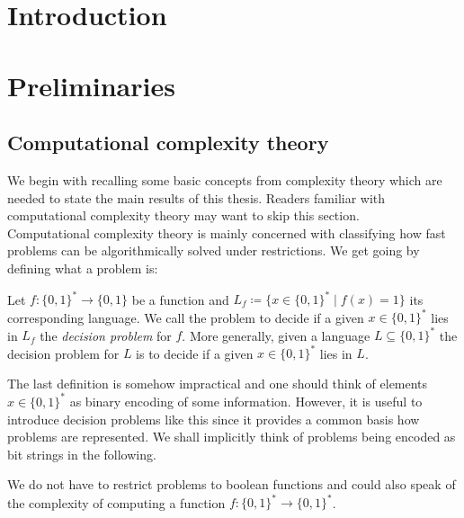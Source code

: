 \section*{Introduction}

\newpage

\section{Preliminaries}
\subsection{Computational complexity theory}
We begin with recalling some basic concepts from complexity theory which are needed to state the main results of this thesis.
Readers familiar with computational complexity theory may want to skip this section.
\\

Computational complexity theory is mainly concerned with classifying how fast problems can be algorithmically solved
under restrictions.
We get going by defining what a problem is:

\begin{Definition}
 Let $f \colon {\lbrace 0,1 \rbrace}^* \to {\lbrace 0,1 \rbrace}$ be a function and $L_f \coloneqq {\lbrace 
 x \in {\lbrace 0,1 \rbrace}^*  \; | \; f(x) = 1 \rbrace} $ its corresponding language. We call the 
 problem to decide if a given $x \in {\lbrace 0,1 \rbrace}^*$ lies in $L_f$ the \emph{decision problem} for $f$.
 More generally, given a language $L \subseteq {\lbrace 0,1 \rbrace}^*$ the decision problem for $L$ is to decide
 if a given $x \in {\lbrace 0,1 \rbrace}^* $ lies in $L$.
\end{Definition}

\begin{Remark}
The last definition is somehow impractical and one should think of elements $x \in {\lbrace 0,1 \rbrace}^*$ as binary encoding
of some information. However, it is useful to introduce decision problems like this since it provides a common basis how problems
are represented. We shall implicitly think of problems being encoded as bit strings in the following.
\end{Remark}

\begin{Remark}
 We do not have to restrict problems to boolean functions and could also speak of the complexity of
 computing a function $f \colon {\lbrace 0,1 \rbrace}^* \to {\lbrace 0,1 \rbrace}^*$. 
\end{Remark}


